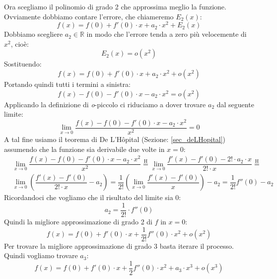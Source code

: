 Ora scegliamo il polinomio di grado 2 che approssima meglio la funzione. 
Ovviamente dobbiamo contare l'errore, che chiameremo $E_2(x)$:
\begin{equation*}
	f(x) = f(0) + f'(0) \cdot x + a_2 \cdot x^2 + E_2(x)
\end{equation*}
Dobbiamo scegliere $a_2 \in \mathbb{R}$ in modo che l'errore tenda a zero più 
velocemente di $x^2$, cioè:
\begin{equation*}
	E_2(x) = o(x^2)
\end{equation*}
Sostituendo:
\begin{equation*}
	f(x) = f(0) + f'(0) \cdot x + a_2 \cdot x^2 + o(x^2)
\end{equation*}
Portando quindi tutti i termini a sinistra:
\begin{equation*}
	f(x) - f(0) - f'(0) \cdot x - a_2 \cdot x^2 = o(x^2)
\end{equation*}
Applicando la definizione di \textit{o}-piccolo ci riduciamo a dover trovare 
$a_2$ dal seguente limite:
\begin{equation*}
	\lim_{x \to 0} \dfrac{f(x) - f(0) - f'(0) \cdot x - a_2 \cdot x^2}{x^2} = 0
\end{equation*}
A tal fine usiamo il teorema di De L'Hôpital (Sezione: \ref{sec_deLHopital}) 
assumendo che la funzione sia derivabile due volte in $x = 0$:
\begin{align*}
	&\lim_{x \to 0} \dfrac{f(x) - f(0) - f'(0) \cdot x - a_2 \cdot x^2}{x^2} 
    \stackrel{\text{H}}{=} \lim_{x \to 0} \dfrac{f'(x) - f'(0) - 2! \cdot a_2 
    \cdot x}{2! \cdot x} \stackrel{\text{H}}{=}\\[10pt]
	&\lim_{x \to 0} \left(\dfrac{f'(x) - f'(0)}{2! \cdot x} - a_2\right) = 
    \dfrac{1}{2!} \left(\lim_{x \to 0} \dfrac{f'(x) - f'(0)}{x} \right) - a_2 =  
    \dfrac{1}{2!} f''(0) - a_2
\end{align*}
Ricordandoci che vogliamo che il risultato del limite sia 0:
\begin{equation*}
	a_2 = \dfrac{1}{2!} \cdot f''(0)
\end{equation*}
Quindi la migliore approssimazione di grado 2 di $f$ in $x = 0$:
\begin{equation*}
	f(x) = f(0) + f'(0) \cdot x + \dfrac{1}{2!} f''(0) \cdot x^2 + o(x^2)
\end{equation*}
Per trovare la migliore approssimazione di grado 3 basta iterare il processo. 
Quindi vogliamo trovare $a_3$:
\begin{equation*}
	f(x) = f(0) + f'(0) \cdot x + \dfrac{1}{2} f''(0) \cdot x^2 + a_3 \cdot 
    x^3 + o(x^3)
\end{equation*}
